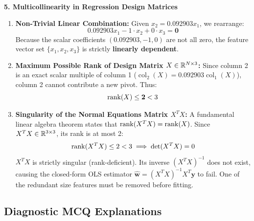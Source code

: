 \textbf{5. Multicollinearity in Regression Design Matrices}
\begin{enumerate}
    \item \textbf{Non-Trivial Linear Combination:}
    Given $x_2 = 0.092903 x_1$, we rearrange:
    \begin{equation*}
    0.092903 x_1 - 1 \cdot x_2 + 0 \cdot x_3 = \mathbf{0}
    \end{equation*}
    Because the scalar coefficients $(0.092903, -1, 0)$ are not all zero, the feature vector set $\{x_1, x_2, x_3\}$ is strictly \textbf{linearly dependent}.
    \item \textbf{Maximum Possible Rank of Design Matrix $X \in \mathbb{R}^{N \times 3}$:}
    Since column 2 is an exact scalar multiple of column 1 ($\operatorname{col}_2(X) = 0.092903 \operatorname{col}_1(X)$), column 2 cannot contribute a new pivot. Thus:
    \begin{equation*}
    \operatorname{rank}(X) \le \mathbf{2} < 3
    \end{equation*}
    \item \textbf{Singularity of the Normal Equations Matrix $X^T X$:}
    A fundamental linear algebra theorem states that $\operatorname{rank}(X^T X) = \operatorname{rank}(X)$.
    Since $X^T X \in \mathbb{R}^{3 \times 3}$, its rank is at most 2:
    \begin{equation*}
    \operatorname{rank}(X^T X) \le 2 < 3 \implies \det(X^T X) = 0
    \end{equation*}
    $X^T X$ is strictly singular (rank-deficient). Its inverse $(X^T X)^{-1}$ does not exist, causing the closed-form OLS estimator $\hat{\mathbf{w}} = (X^T X)^{-1} X^T \mathbf{y}$ to fail. One of the redundant size features must be removed before fitting.
\end{enumerate}

\subsection*{Diagnostic MCQ Explanations}


